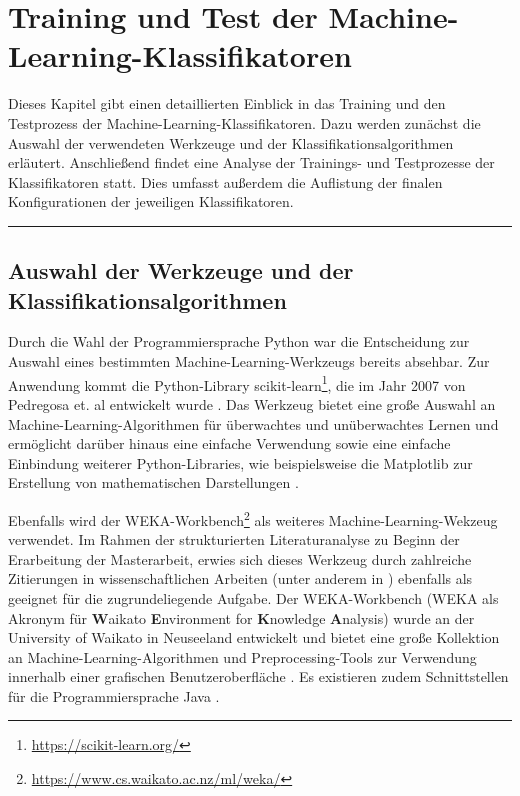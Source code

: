 
\chapter{Training und Test der Machine-Learning-Klassifikatoren}
\label{training}

Dieses Kapitel gibt einen detaillierten Einblick in das Training und den Testprozess der Machine-Learning-Klassifikatoren. Dazu werden zunächst die Auswahl der verwendeten Werkzeuge und der Klassifikationsalgorithmen erläutert. Anschließend findet eine Analyse der Trainings- und Testprozesse der Klassifikatoren statt. Dies umfasst außerdem die Auflistung der finalen Konfigurationen der jeweiligen Klassifikatoren.
\\
\hrule

\section{Auswahl der Werkzeuge und der Klassifikationsalgorithmen}

Durch die Wahl der Programmiersprache Python war die Entscheidung zur Auswahl eines bestimmten Machine-Learning-Werkzeugs bereits absehbar. Zur Anwendung kommt die Python-Library scikit-learn\footnote{\href{https://scikit-learn.org/}{https://scikit-learn.org/}}, die im Jahr 2007 von Pedregosa et. al entwickelt wurde \cite{scikit}. Das Werkzeug bietet eine große Auswahl an Machine-Learning-Algorithmen für überwachtes und unüberwachtes Lernen und ermöglicht darüber hinaus eine einfache Verwendung sowie eine einfache Einbindung weiterer Python-Libraries, wie beispielsweise die Matplotlib zur Erstellung von mathematischen Darstellungen \cite{scikit}.

Ebenfalls wird der WEKA-Workbench\footnote{\href{https://www.cs.waikato.ac.nz/ml/weka/}{https://www.cs.waikato.ac.nz/ml/weka/}} als weiteres Machine-Learning-Wekzeug verwendet. Im Rahmen der strukturierten Literaturanalyse zu Beginn der Erarbeitung der Masterarbeit, erwies sich dieses Werkzeug durch zahlreiche Zitierungen in wissenschaftlichen Arbeiten (unter anderem in \cite{Hammouri2018,Queiroz2016,Ratzinger2008}) ebenfalls als geeignet für die zugrundeliegende Aufgabe. Der WEKA-Workbench (WEKA als Akronym für \textbf{W}aikato \textbf{E}nvironment for \textbf{K}nowledge \textbf{A}nalysis) wurde an der University of Waikato in Neuseeland entwickelt und bietet eine große Kollektion an Machine-Learning-Algorithmen und Preprocessing-Tools zur Verwendung innerhalb einer grafischen Benutzeroberfläche \cite{Weka2016}. Es existieren zudem Schnittstellen für die Programmiersprache Java \cite{Weka2016}. 

